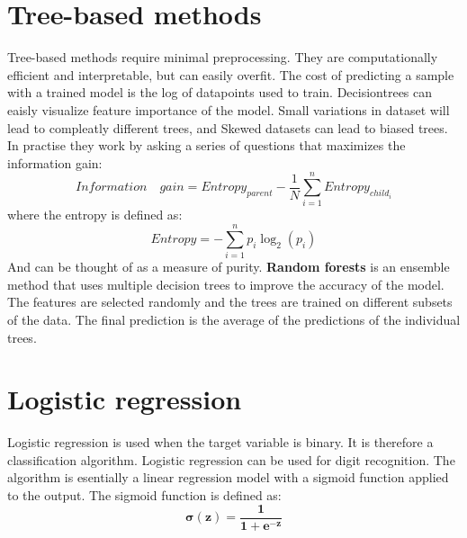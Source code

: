 \section{Tree-based methods}
Tree-based methods require minimal preprocessing. They are computationally efficient and interpretable, but can easily overfit. The cost of predicting a sample with a trained model is the log of datapoints used to train. 
Decisiontrees can eaisly visualize feature importance of the model. Small variations in dataset will lead to compleatly different trees, and Skewed datasets can lead to biased trees. \newline
In practise they work by asking a series of questions that maximizes the information gain:
\begin{equation}
    Information \quad gain = Entropy_{parent} - \frac{1}{N}\sum_{i=1}^{n} Entropy_{child_i}
\end{equation}
where the entropy is defined as:
\begin{equation}
    Entropy = -\sum_{i=1}^{n} p_i \log_2(p_i)
\end{equation}
And can be thought of as a measure of purity. \textbf{Random forests} is an ensemble method that uses multiple decision trees to improve the accuracy of the model. \newline
The features are selected randomly and the trees are trained on different subsets of the data. The final prediction is the average of the predictions of the individual trees.


\section{Logistic regression}
Logistic regression is used when the target variable is binary. It is therefore a classification algorithm.
Logistic regression can be used for digit recognition. The algorithm is esentially a linear regression model with a sigmoid function applied to the output. The sigmoid function is defined as:
\begin{equation}
    \mathbf{
    \sigma(z) = \frac{1}{1+e^{-z}}
    }
\end{equation}

